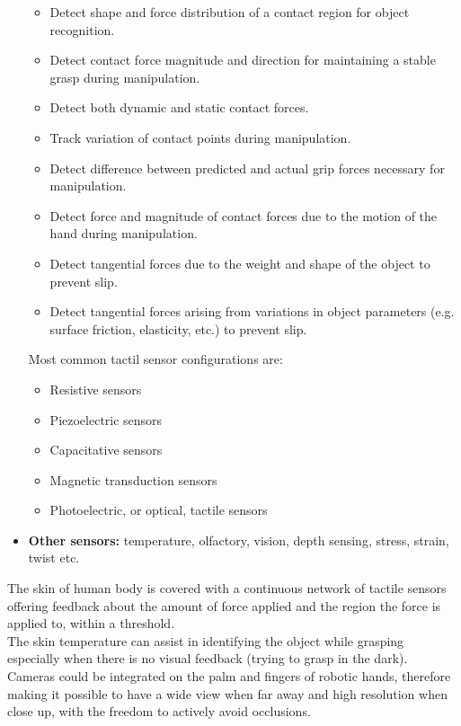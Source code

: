 \documentclass[a4paper, 10pt, conference]{ieeeconf}      %
\begin{document}
\begin{itemize}
\begin{itemize}
			\item Detect shape and force distribution of a contact region for object recognition.
			\item Detect contact force magnitude and direction for maintaining a stable grasp during manipulation.
			\item Detect both dynamic and static contact forces.
			\item Track variation of contact points during manipulation.
			\item Detect difference between predicted and actual grip forces necessary for manipulation.
			\item Detect force and magnitude of contact forces due to the motion of the hand during manipulation.
			\item Detect tangential forces due to the weight and shape of the object to prevent slip.
			\item Detect tangential forces arising from variations in object parameters (e.g. surface friction, elasticity, etc.) to prevent slip.\\
		\end{itemize}
Most common tactil sensor configurations are:
		\begin{itemize}
			\item Resistive sensors
			\item Piezoelectric sensors
			\item Capacitative sensors
			\item Magnetic transduction sensors
			\item Photoelectric, or optical, tactile sensors\\
		\end{itemize}
	\item \textbf{Other sensors:} temperature, olfactory, vision, depth sensing, stress, strain, twist etc.\\
	\end{itemize}
The skin of human body is covered with a continuous network of tactile sensors offering feedback about the amount of force applied and the region the force is applied to, within a threshold.\\
The skin temperature can assist in identifying the object while grasping especially when there is no visual feedback (trying to grasp in the dark).\\
Cameras could be integrated on the palm and fingers of robotic hands, therefore making it possible to have a wide view when far away and high resolution when close up, with the freedom to actively avoid occlusions.\\
\end{document}
